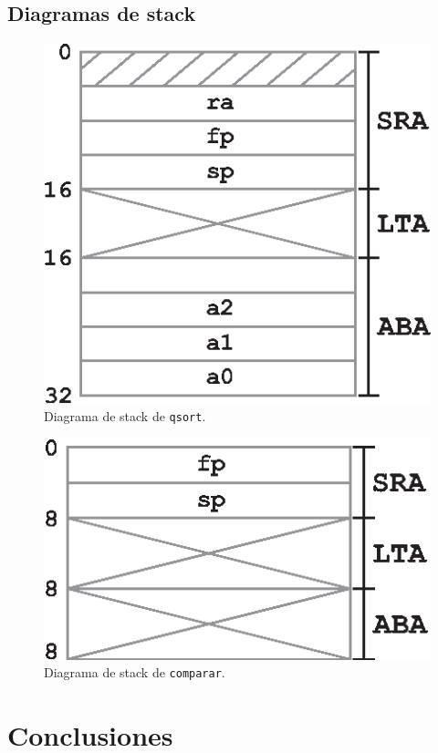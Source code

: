 \documentclass[a4paper, 12pt]{article}
\begin{document}
	\subsection{Diagramas de stack}
	
	\begin{figure}[H]
		\centering
		\includegraphics[scale=1]{files/pila_qsort.eps}
		\caption{Diagrama de stack de \texttt{qsort}.}
		\label{fig:diag:pila_qsort}
	\end{figure}
	
	\begin{figure}[H]
		\centering
		\includegraphics[scale=1]{files/pila_comparar.eps}
		\caption{Diagrama de stack de \texttt{comparar}.}
		\label{fig:diag:pila_comparar}
	\end{figure}
	
	\section{Conclusiones}
	
\end{document}
